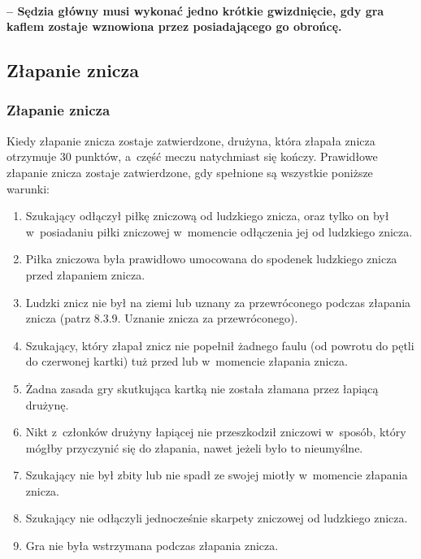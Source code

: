 \documentclass[12pt,a4paper]{article}
\begin{document}
\paragraph{ -- Sędzia główny musi wykonać jedno krótkie
	gwizdnięcie, gdy gra kaflem zostaje wznowiona przez posiadającego go
	obrońcę.}

\subsection{Złapanie znicza}

\subsubsection{Złapanie znicza}

Kiedy złapanie znicza zostaje zatwierdzone, drużyna, która złapała
znicza otrzymuje 30 punktów, a~część meczu natychmiast się kończy.
Prawidłowe złapanie znicza zostaje zatwierdzone, gdy spełnione są
wszystkie poniższe warunki:

\begin{enumerate}
	\item
	      Szukający odłączył piłkę zniczową od ludzkiego znicza, oraz tylko on
	      był w~posiadaniu piłki zniczowej w~momencie odłączenia jej od
	      ludzkiego znicza.
	\item
	      Piłka zniczowa była prawidłowo umocowana do spodenek ludzkiego znicza
	      przed złapaniem znicza.
	\item
	      Ludzki znicz nie był na ziemi lub uznany za przewróconego podczas
	      złapania znicza (patrz 8.3.9. Uznanie znicza za przewróconego).
	\item
	      Szukający, który złapał znicz nie popełnił żadnego faulu (od powrotu
	      do pętli do czerwonej kartki) tuż przed lub w~momencie złapania
	      znicza.
	\item
	      Żadna zasada gry skutkująca kartką nie została złamana przez łapiącą
	      drużynę.
	\item
	      Nikt z~członków drużyny łapiącej nie przeszkodził zniczowi w~sposób,
	      który mógłby przyczynić się do złapania, nawet jeżeli było to
	      nieumyślne.
	\item
	      Szukający nie był zbity lub nie spadł ze swojej miotły w~momencie
	      złapania znicza.
	\item
	      Szukający nie odłączyli jednocześnie skarpety zniczowej od ludzkiego
	      znicza.
	\item
	      Gra nie była wstrzymana podczas złapania znicza.
\end{enumerate}
\end{document}
